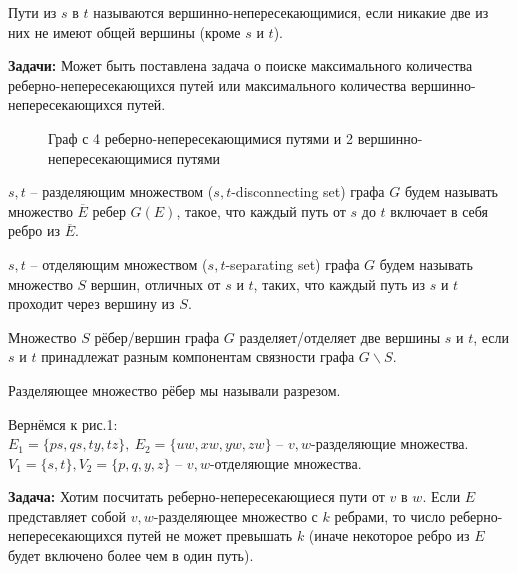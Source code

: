 	\begin{Def}
		Пути из $s$ в $t$ называются вершинно-непересекающимися, если никакие две из них не имеют общей вершины (кроме $s$ и $t$).
	\end{Def}

	\textbf{Задачи:} Может быть поставлена задача о поиске максимального количества реберно-непересекающихся путей или максимального количества вершинно-непересекающихся путей.

	\begin{figure*}[h]
		\centering
		\def\svgwidth{0.5\columnwidth}
		
		\caption{Граф с 4 реберно-непересекающимися путями и 2 вершинно-непересекающимися путями}
	\end{figure*}

	\begin{Def}
		$s, t$ -- разделяющим множеством ($s, t$-disconnecting set) графа $G$ будем называть множество $\overline{E}$ ребер $G(E)$, такое, что каждый путь от $s$ до $t$ включает в себя ребро из $\overline{E}$.
	\end{Def}

	\begin{Def}
		$s, t$ -- отделяющим множеством ($s, t$-separating set) графа $G$ будем называть множество $S$ вершин, отличных от $s$ и $t$, таких, что каждый путь из $s$ и $t$ проходит через вершину из $S$.
	\end{Def}

	\begin{Def}[Альтернативные]
		Множество $S$ рёбер/вершин графа $G$ разделяет/отделяет две вершины $s$ и $t$, если $s$ и $t$ принадлежат разным компонентам связности графа $G \backslash S$.
	\end{Def}

	\begin{Rem}
		Разделяющее множество рёбер мы называли разрезом.
	\end{Rem}

	Вернёмся к рис.1: \\
	$E_1 = \{ ps, qs, ty, tz \}, \ E_2 = \{ uw, xw, yw, zw \}$ -- $v, w$-разделяющие множества. \\
	$V_1 = \{ s, t \}, V_2 = \{ p, q, y, z \}$ -- $v, w$-отделяющие множества.

	\textbf{Задача:} Хотим посчитать реберно-непересекающиеся пути от $v$ в $w$.
	Если $E$ представляет собой $v, w$-разделяющее множество с $k$ ребрами, то число реберно-непересекающихся путей не может превышать $k$
	(иначе некоторое ребро из $E$ будет включено более чем в один путь). 
	
